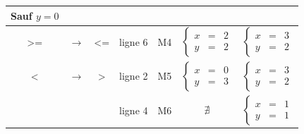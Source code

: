 \documentclass[12pt,a4paper,openany]{book}
\begin{document}
\begin{tabular}{ccc|ccc|c}
\begin{minipage}{55pt}
			Sauf $y=0$
		\end{minipage}
		 \\ 
		\hline
		>= & $\rightarrow$ & <= & ligne 6 & M4 & 
		\begin{minipage}{55pt}
			\begin{displaymath}
				\left\{\begin{array}{ccc}
					x &=&2\\
					y &=&2
				\end{array}
				\right.
			\end{displaymath}
		\end{minipage}
		&
		\begin{minipage}{55pt}
			\begin{displaymath}
				\left\{\begin{array}{ccc}
					x &=&3\\
					y &=&2
				\end{array}
				\right.
			\end{displaymath}
		\end{minipage}
		\\ 
		\hline
		< & $\rightarrow$ & > & ligne 2 & M5 & 
		\begin{minipage}{55pt}
			\begin{displaymath}
				\left\{\begin{array}{ccc}
					x &=&0\\
					y &=&3
				\end{array}
				\right.
			\end{displaymath}
		\end{minipage}
		&
		\begin{minipage}{55pt}
			\begin{displaymath}
				\left\{\begin{array}{ccc}
					x &=&3\\
					y &=&2
				\end{array}
				\right.
			\end{displaymath}
		\end{minipage}
		\\ 
		& & & ligne 4 & M6 & 
		\begin{minipage}{55pt}
			\begin{displaymath}
				\nexists
			\end{displaymath}
		\end{minipage}
		&
		\begin{minipage}{55pt}
			\begin{displaymath}
				\left\{\begin{array}{ccc}
					x &=&1\\
					y &=&1
				\end{array}
				\right.
			\end{displaymath}
		\end{minipage}
		\\ 
	\end{tabular}
		\newpage
\end{document}
